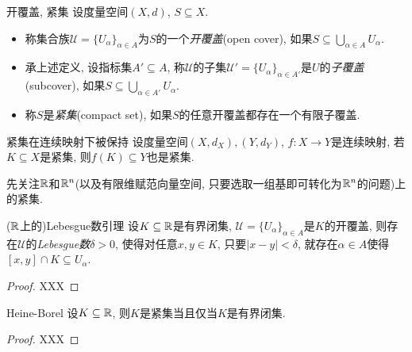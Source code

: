\begin{definition}{开覆盖, 紧集}
	设度量空间$(X,d)$, $S \subseteq X$. 
	\begin{itemize}
		\item 称集合族$\mathcal{U} = \{ U_{\alpha} \}_{\alpha \in A}$为$S$的一个\textit{开覆盖}(open cover), 如果$S \subseteq \bigcup_{\alpha \in A} U_{\alpha}$. 
		\item 承上述定义, 设指标集$A' \subseteq A$, 称$\mathcal{U}$的子集$\mathcal{U}'= \{ U_{\alpha} \}_{\alpha \in A'}$是$U$的\textit{子覆盖}(subcover), 如果$S \subseteq \bigcup_{\alpha \in A'} U_{\alpha}$. 
		\item 称$S$是\textit{紧集}(compact set), 如果$S$的任意开覆盖都存在一个有限子覆盖. 
	\end{itemize}
\end{definition}

\begin{lemma}{紧集在连续映射下被保持}
	设度量空间$(X,d_X),(Y,d_Y)$, $f:X \to Y$是连续映射, 若$K \subseteq X$是紧集, 则$f(K) \subseteq Y$也是紧集. 
\end{lemma}

先关注$\mathbb{R}$和$\mathbb{R} ^n$(以及有限维赋范向量空间, 只要选取一组基即可转化为$\mathbb{R} ^n$的问题)上的紧集. 

\begin{proposition}{($\mathbb{R}$上的)Lebesgue数引理}
	设$K \subseteq \mathbb{R}$是有界闭集, $\mathcal{U} = \{ U_{\alpha} \}_{\alpha \in A}$是$K$的开覆盖, 则存在$\mathcal{U}$的\textit{Lebesgue数}$\delta >0$, 使得对任意$x,y \in K$, 只要$|x-y|<\delta$, 就存在$\alpha \in A$使得$[x,y] \cap K \subseteq U_{\alpha}$. 
\end{proposition}
\begin{proof}
	XXX
\end{proof}

\begin{theorem}{Heine-Borel}
	设$K \subseteq \mathbb{R}$, 则$K$是紧集当且仅当$K$是有界闭集. 
\end{theorem}
\begin{proof}
	XXX
\end{proof}